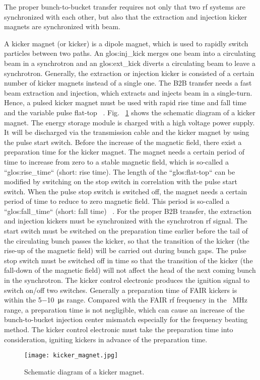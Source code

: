 The proper bunch-to-bucket transfer requires not only that two rf systems are synchronized with each other, but also that the extraction and injection kicker magnets are synchronized with beam.

A kicker magnet (or kicker) is a dipole magnet, which is used to rapidly switch particles between two paths. An \gls{glos:inj_kick} merges one beam into a circulating beam in a synchrotron and an \gls{glos:ext_kick} diverts a circulating beam to leave a synchrotron. Generally, the extraction or injection kicker is consisted of a certain number of kicker magnets instead of a single one. The B2B transfer needs a fast beam extraction and injection, which extracts and injects beam in a single-turn. Hence, a pulsed kicker magnet must be used with rapid rise time and fall time and the variable pulse flat-top ~\cite{petzenhauser_concept_2016}. Fig. ~\ref{kicker_magnet} shows the schematic diagram of a kicker magnet. The energy storage module is charged with a high voltage power supply. It will be discharged via the transmission cable and the kicker magnet by using the pulse start switch. Before the increase of the magnetic field, there exist a preparation time for the kicker magnet. The magnet needs a certain period of time to increase from zero to a stable magnetic field, which is so-called a ``\gls{glos:rise_time}`` (short: rise time). The length of the ``\gls{glos:flat-top}`` can be modified by switching on the stop switch in correlation with the pulse start switch. When the pulse stop switch is switched off, the magnet needs a certain period of time to reduce to zero magnetic field. This period is so-called a ``\gls{glos:fall_time}`` (short: fall time) ~\cite{blell_injection_2014}. For the proper B2B transfer, the extraction and injection kickers must be synchronized with the synchrotron rf signal. The start switch must be switched on the preparation time earlier before the tail of the circulating bunch passes the kicker, so that the transition of the kicker (the rise-up of the magnetic field) will be carried out during bunch gaps. The pulse stop switch must be switched off in time so that the transition of the kicker (the fall-down of the magnetic field) will not affect the head of the next coming bunch in the synchrotron. The kicker control electronic produces the ignition signal to switch on/off two switches. Generally a preparation time of FAIR kickers is within the \SI{5}{}$-$\SI{10}{\micro\second} range. Compared with the FAIR rf frequency in the \SI{}{MHz} range, a preparation time is not negligible, which can cause an increase of the bunch-to-bucket injection center mismatch especially for the frequency beating method. The kicker control electronic must take the preparation time into consideration, igniting kickers in advance of the preparation time.
\begin{figure}[!htb]
   \centering   
   \texttt{[image: kicker\_magnet.jpg]}
   \caption{Schematic diagram of a kicker magnet.}
   \label{kicker_magnet}
\end{figure}
 
